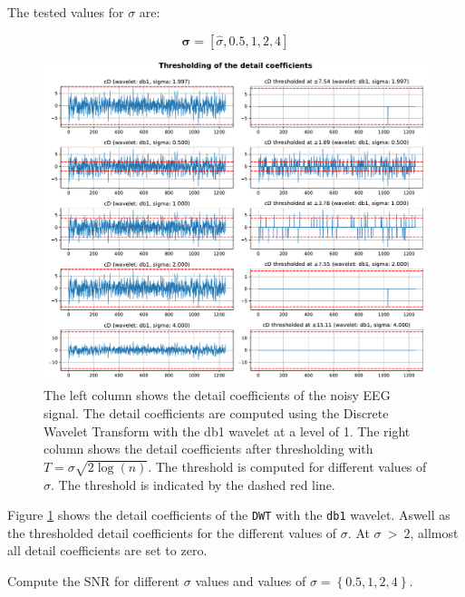The tested values for $\sigma$ are:

\begin{equation}
    \mathbf{\sigma} = [ \hat{\sigma}, 0.5, 1, 2, 4 ]
\end{equation}

\begin{figure}[H]
    \centering
    \includegraphics[width=\textwidth]{./img/problem3-thresholding-of-detail-coefficients.pdf}
    \caption{The left column shows the detail coefficients of the noisy EEG signal. The detail coefficients are computed using the Discrete Wavelet Transform with the \textrm{db1} wavelet at a level of 1. The right column shows the detail coefficients after thresholding with $T = \sigma \sqrt{2 \log(n)}$. The threshold is computed for different values of $\sigma$. The threshold is indicated by the dashed red line.}
    \label{fig:problem3thresholding}
\end{figure}

Figure \ref{fig:problem3thresholding} shows the detail coefficients of the \texttt{DWT} with the \texttt{db1} wavelet. Aswell as the thresholded detail coefficients for the different values of $\sigma$. At $\sigma\ >\ 2$, allmost all detail coefficients are set to zero. 



\begin{tcolorbox}[colback=blue!5!white,colframe=blue!75!black,title=Problem 3.a]
    Compute the SNR for different $\sigma$ values and values of $\sigma = \left \lbrace 0.5, 1, 2, 4 \right \rbrace$.
\end{tcolorbox}


